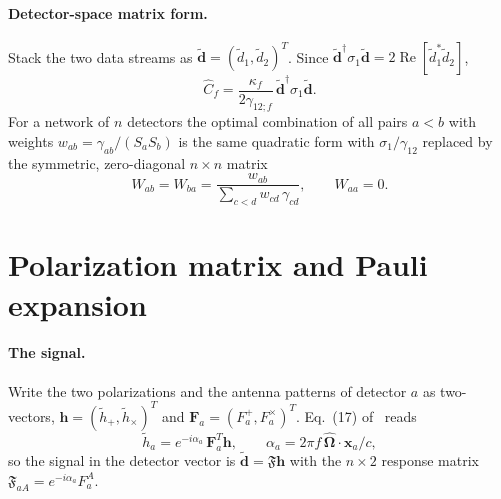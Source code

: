 \documentclass[11pt]{article}
\renewcommand{\Re}{\operatorname{Re}}
\newcommand{\bh}{\bm{h}}
\newcommand{\bF}{\bm{F}}
\newcommand{\bOmega}{\hat{\bm{\Omega}}}
\newcommand{\cF}{\mathfrak{F}}
\newcommand{\ft}[1]{\tilde{#1}}
\theoremstyle{remark}
\begin{document}
\paragraph{Detector-space matrix form.}
Stack the two data streams as $\ft{\bm d} = (\ft d_1, \ft d_2)^T$. Since
$\ft{\bm d}^\dagger \sigma_1 \ft{\bm d} = 2 \Re[\ft d_1^* \ft d_2]$,
\begin{equation}
  \hat C_f = \frac{\kappa_f}{2\gamma_{12;f}}\, \ft{\bm d}^\dagger \sigma_1 \ft{\bm d}.
  \label{eq:quadratic}
\end{equation}
For a network of $n$ detectors the optimal combination of all pairs $a<b$ with
weights $w_{ab} = \gamma_{ab}/(S_a S_b)$ is the same quadratic form with
$\sigma_1/\gamma_{12}$ replaced by the symmetric, zero-diagonal $n\times n$ matrix
\begin{equation}
  W_{ab} = W_{ba} = \frac{w_{ab}}{\sum_{c<d} w_{cd}\,\gamma_{cd}}, \qquad
  W_{aa} = 0 .
  \label{eq:network-matrix}
\end{equation}

\section{Polarization matrix and Pauli expansion}

\paragraph{The signal.}
Write the two polarizations and the antenna patterns of detector $a$ as
two-vectors, $\bh = (\ft h_+, \ft h_\times)^T$ and
$\bF_a = (F_a^+, F_a^\times)^T$. Eq.~(17) of~\cite{Zhong2026} reads
\begin{equation}
  \ft h_a = e^{-i\alpha_a}\, \bF_a^T \bh, \qquad
  \alpha_a = 2\pi f\, \bOmega\cdot\bm x_a / c ,
\end{equation}
so the signal in the detector vector is $\ft{\bm d} = \cF \bh$ with the
$n \times 2$ response matrix $\cF_{aA} = e^{-i\alpha_a} F_a^A$.
\end{document}
